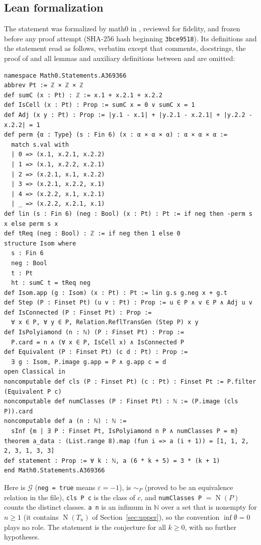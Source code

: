 \documentclass[11pt]{amsart}
\theoremstyle{plain}
\theoremstyle{definition}
\newcommand{\N}{\mathbb{N}}
\newcommand{\G}{\mathcal{G}}
\newcommand{\cls}{\operatorname{N}}
\begin{document}
\subsection*{Lean formalization}
The statement was formalized by math0 in , reviewed for fidelity, and frozen before any proof attempt (SHA-256 hash beginning \texttt{3bce9518}). Its definitions and the statement read as follows, verbatim except that comments, docstrings, the proof of  and all lemmas and auxiliary definitions between  and  are omitted:
\begin{lstlisting}
namespace Math0.Statements.A369366
abbrev Pt := ℤ × ℤ × ℤ
def sumC (x : Pt) : ℤ := x.1 + x.2.1 + x.2.2
def IsCell (x : Pt) : Prop := sumC x = 0 ∨ sumC x = 1
def Adj (x y : Pt) : Prop := |y.1 - x.1| + |y.2.1 - x.2.1| + |y.2.2 - x.2.2| = 1
def perm {α : Type} (s : Fin 6) (x : α × α × α) : α × α × α :=
  match s.val with
  | 0 => (x.1, x.2.1, x.2.2)
  | 1 => (x.1, x.2.2, x.2.1)
  | 2 => (x.2.1, x.1, x.2.2)
  | 3 => (x.2.1, x.2.2, x.1)
  | 4 => (x.2.2, x.1, x.2.1)
  | _ => (x.2.2, x.2.1, x.1)
def lin (s : Fin 6) (neg : Bool) (x : Pt) : Pt := if neg then -perm s x else perm s x
def tReq (neg : Bool) : ℤ := if neg then 1 else 0
structure Isom where
  s : Fin 6
  neg : Bool
  t : Pt
  ht : sumC t = tReq neg
def Isom.app (g : Isom) (x : Pt) : Pt := lin g.s g.neg x + g.t
def Step (P : Finset Pt) (u v : Pt) : Prop := u ∈ P ∧ v ∈ P ∧ Adj u v
def IsConnected (P : Finset Pt) : Prop :=
  ∀ x ∈ P, ∀ y ∈ P, Relation.ReflTransGen (Step P) x y
def IsPolyiamond (n : ℕ) (P : Finset Pt) : Prop :=
  P.card = n ∧ (∀ x ∈ P, IsCell x) ∧ IsConnected P
def Equivalent (P : Finset Pt) (c d : Pt) : Prop :=
  ∃ g : Isom, P.image g.app = P ∧ g.app c = d
open Classical in
noncomputable def cls (P : Finset Pt) (c : Pt) : Finset Pt := P.filter (Equivalent P c)
noncomputable def numClasses (P : Finset Pt) : ℕ := (P.image (cls P)).card
noncomputable def a (n : ℕ) : ℕ :=
  sInf {m | ∃ P : Finset Pt, IsPolyiamond n P ∧ numClasses P = m}
theorem a_data : (List.range 8).map (fun i => a (i + 1)) = [1, 1, 2, 2, 3, 1, 3, 3]
def statement : Prop := ∀ k : ℕ, a (6 * k + 5) = 3 * (k + 1)
end Math0.Statements.A369366
\end{lstlisting}
Here  is $\G$ (\texttt{neg = true} means $\varepsilon=-1$),  is $\sim_P$ (proved to be an equivalence relation in the file), \texttt{cls P c} is the class of $c$, and \texttt{numClasses P} $=\cls(P)$ counts the distinct classes. \texttt{a n} is an infimum in $\N$ over a set that is nonempty for $n\ge1$ (it contains $\cls(T_n)$ of Section~\ref{sec:upper}), so the convention $\inf\emptyset=0$ plays no role. The statement is the conjecture for all $k\ge0$, with no further hypotheses.
\end{document}
